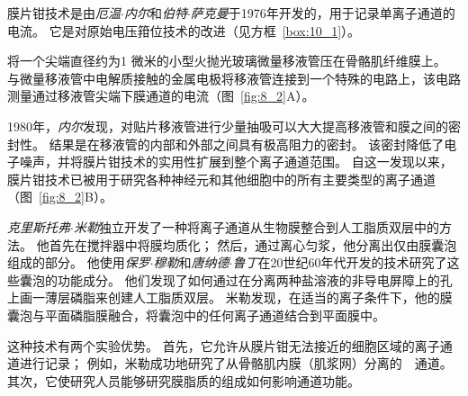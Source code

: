\begin{proposition} \label{box:8_1}
	
	\quad \quad 膜片钳技术是由\textit{厄温$\cdot$内尔}和\textit{伯特$\cdot$萨克曼}于1976年开发的，用于记录单离子通道的电流。
	它是对原始电压箝位技术的改进（见方框~\ref{box:10_1}）。
	
	\quad \quad 将一个尖端直径约为1 微米的小型火抛光玻璃微量移液管压在骨骼肌纤维膜上。
	与微量移液管中电解质接触的金属电极将移液管连接到一个特殊的电路上，该电路测量通过移液管尖端下膜通道的电流（图~\ref{fig:8_2}A）。
	
	\quad \quad 1980年，\textit{内尔}发现，对贴片移液管进行少量抽吸可以大大提高移液管和膜之间的密封性。
	结果是在移液管的内部和外部之间具有极高阻力的密封。
	该密封降低了电子噪声，并将膜片钳技术的实用性扩展到整个离子通道范围。
	自这一发现以来，膜片钳技术已被用于研究各种神经元和其他细胞中的所有主要类型的离子通道（图~\ref{fig:8_2}B）。
	
	\quad \quad \textit{克里斯托弗$\cdot$米勒}独立开发了一种将离子通道从生物膜整合到人工脂质双层中的方法。
	他首先在搅拌器中将膜均质化；
	然后，通过离心匀浆，他分离出仅由膜囊泡组成的部分。
	他使用\textit{保罗$\cdot$穆勒}和\textit{唐纳德$\cdot$鲁丁}在20世纪60年代开发的技术研究了这些囊泡的功能成分。
	他们发现了如何通过在分离两种盐溶液的非导电屏障上的孔上画一薄层磷脂来创建人工脂质双层。
	米勒发现，在适当的离子条件下，他的膜囊泡与平面磷脂膜融合，将囊泡中的任何离子通道结合到平面膜中。
	
	\quad \quad 这种技术有两个实验优势。
	首先，它允许从膜片钳无法接近的细胞区域的离子通道进行记录；
	例如，米勒成功地研究了从骨骼肌内膜（肌浆网）分离的~~通道。
	其次，它使研究人员能够研究膜脂质的组成如何影响通道功能。
	
\end{proposition}


